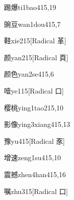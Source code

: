 \begin{verbete}{踢爆}{ti1bao4}{15,19}
\end{verbete}

\begin{verbete}{豌豆}{wan1dou4}{15,7}
\end{verbete}

\begin{verbete}{鞋}{xie2}{15}[Radical 革]
\end{verbete}

\begin{verbete}{颜}{yan2}{15}[Radical 頁]
\end{verbete}

\begin{verbete}{颜色}{yan2se4}{15,6}
\end{verbete}

\begin{verbete}{噎}{ye1}{15}[Radical 口]
\end{verbete}

\begin{verbete}{樱桃}{ying1tao2}{15,10}
\end{verbete}

\begin{verbete}{影像}{ying3xiang4}{15,13}
\end{verbete}

\begin{verbete}{豫}{yu4}{15}[Radical 豕]
\end{verbete}

\begin{verbete}{增速}{zeng1su4}{15,10}
\end{verbete}

\begin{verbete}{震撼}{zhen4han4}{15,16}
\end{verbete}

\begin{verbete}{嘱}{zhu3}{15}[Radical 口]
\end{verbete}

